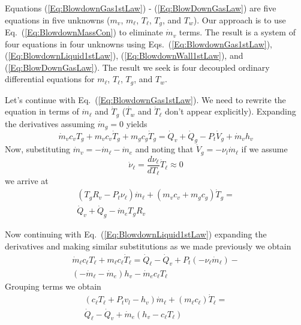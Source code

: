 Equations (\ref{Eq:BlowdownGas1stLaw}) - (\ref{Eq:BlowDownGasLaw})
are five equations in five unknowns ($m_v$, $m_\ell$, $T_\ell$,
$T_g$, and $T_w$). Our approach is to use
Eq.~(\ref{Eq:BlowdownMassCon}) to eliminate $\dot{m}_v$ terms.  The
result is a system of four equations in four unknowns using
Eqs.~(\ref{Eq:BlowdownGas1stLaw}), (\ref{Eq:BlowdownLiquid1stLaw}),
(\ref{Eq:BlowdownWall1stLaw}), and (\ref{Eq:BlowDownGasLaw}).  The
result we seek is four decoupled ordinary differential equations for
$m_\ell$, $T_\ell$, $T_g$, and $T_w$.


Let's continue with Eq.~(\ref{Eq:BlowdownGas1stLaw}).  We need to
rewrite the equation in terms of $\dot{m}_\ell$ and $\dot{T}_g$
($\dot{T_w}$ and $\dot{T}_\ell$ don't appear explicitly).  Expanding
the derivatives assuming $\dot{m}_g = 0$ yields
%
\begin{equation}
   \dot{m}_v c_v T_g + m_v c_v \dot{T}_g +  m_g c_g \dot{T}_g = \dot{Q}_v + \dot{Q}_g - P_t \dot{V}_g + \dot{m}_v h_{v}
\end{equation}
%
Now, substituting $\dot{m}_v = -\dot{m}_\ell - \dot{m}_e$ and noting
that $\dot{V}_g = -\nu_l \dot{m}_\ell$ if we assume
%
 \[\dot{\nu}_\ell = \frac{d \nu_\ell}{dT_\ell }\dot{T}_\ell
\approx 0
\]
%
we arrive at
%
\begin{equation}
   \begin{split}
      \left( T_g R_v - P_t \nu_\ell  \right) \dot{m}_\ell + \left( m_v c_v + m_g c_g\right)\dot{T}_g = \\
      \dot{Q}_v + \dot{Q}_g - \dot{m}_e T_g R_v   \label{Eq:BlowdownWVaporEq1}
   \end{split}
\end{equation}
%

Now continuing with Eq.~(\ref{Eq:BlowdownLiquid1stLaw}) expanding
the derivatives and making similar substitutions as we made
previously we obtain
%
\begin{equation}
\begin{split}
    \dot{m}_\ell c_\ell T_\ell + m_\ell c_\ell \dot{T}_\ell = \dot{Q}_\ell - \dot{Q}_v +
    P_t(-\nu_\ell \dot{m}_\ell) - \\ (-\dot{m}_\ell - \dot{m}_e)h_{v} - \dot{m}_e c_\ell T_\ell
\end{split}
\end{equation}
%
Grouping terms we obtain
%
\begin{equation}
\begin{split}
    ( c_\ell T_\ell  + P_t v_l - h_{v})\dot{m}_\ell + ( m_\ell c_\ell )\dot{T}_\ell = \\
    \dot{Q}_\ell - \dot{Q}_v + \dot{m}_e (h_v - c_\ell T_\ell) \label{Eq:BlowdownWVaporEq2}
\end{split}
\end{equation}

